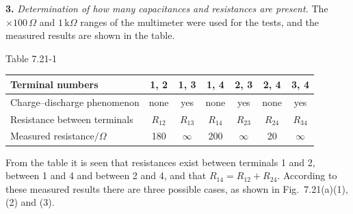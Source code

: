 \textbf{3.} \emph{Determination of how many capacitances and resistances are present.} The $\times100\,\Omega$ and $1\,\mathrm{k}\Omega$ ranges of the multimeter were used for the tests, and the measured results are shown in the table.

\begin{center}
{\small Table 7.21-1}\\[2pt]
\begin{tabular}{@{}lcccccc@{}}
\toprule
Terminal numbers & 1, 2 & 1, 3 & 1, 4 & 2, 3 & 2, 4 & 3, 4\\
\midrule
Charge--discharge phenomenon & none & yes & none & yes & none & yes\\
Resistance between terminals & $R_{12}$ & $R_{13}$ & $R_{14}$ & $R_{23}$ & $R_{24}$ & $R_{34}$\\
Measured resistance$/\Omega$ & 180 & $\infty$ & 200 & $\infty$ & 20 & $\infty$\\
\bottomrule
\end{tabular}
\end{center}

From the table it is seen that resistances exist between terminals 1 and 2, between 1 and 4 and between 2 and 4, and that $R_{14}=R_{12}+R_{24}$. According to these measured results there are three possible cases, as shown in Fig.~7.21(a)(1), (2) and (3).


